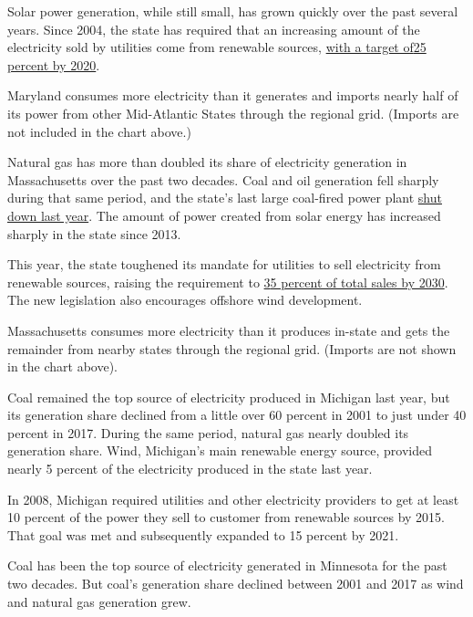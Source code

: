 Solar power generation, while still small, has grown quickly over the
past several years. Since 2004, the state has required that an
increasing amount of the electricity sold by utilities come from
renewable sources,
\href{https://www.psc.state.md.us/electricity/renewable-energy/}{with a
target
of}\href{https://www.psc.state.md.us/electricity/renewable-energy/}{25
percent by 2020}.

Maryland consumes more electricity than it generates and imports nearly
half of its power from other Mid-Atlantic States through the regional
grid. (Imports are not included in the chart above.)

Natural gas has more than doubled its share of electricity generation in
Massachusetts over the past two decades. Coal and oil generation fell
sharply during that same period, and the state's last large coal-fired
power plant
\href{https://www.wbur.org/bostonomix/2017/05/31/brayton-power-plant-somerset}{shut
down last year}. The amount of power created from solar energy has
increased sharply in the state since 2013.

This year, the state toughened its mandate for utilities to sell
electricity from renewable sources, raising the requirement to
\href{https://blog.ucsusa.org/john-rogers/massachusetts-2018-clean-energy-bill}{3}\href{https://blog.ucsusa.org/john-rogers/massachusetts-2018-clean-energy-bill}{5
percent of total sales by 2030}. The new legislation also encourages
offshore wind development.

Massachusetts consumes more electricity than it produces in-state and
gets the remainder from nearby states through the regional grid.
(Imports are not shown in the chart above).

Coal remained the top source of electricity produced in Michigan last
year, but its generation share declined from a little over 60 percent in
2001 to just under 40 percent in 2017. During the same period, natural
gas nearly doubled its generation share. Wind, Michigan's main renewable
energy source, provided nearly 5 percent of the electricity produced in
the state last year.

In 2008, Michigan required utilities and other electricity providers to
get at least 10 percent of the power they sell to customer from
renewable sources by 2015. That goal was met and subsequently expanded
to 15 percent by 2021.

Coal has been the top source of electricity generated in Minnesota for
the past two decades. But coal's generation share declined between 2001
and 2017 as wind and natural gas generation grew.

